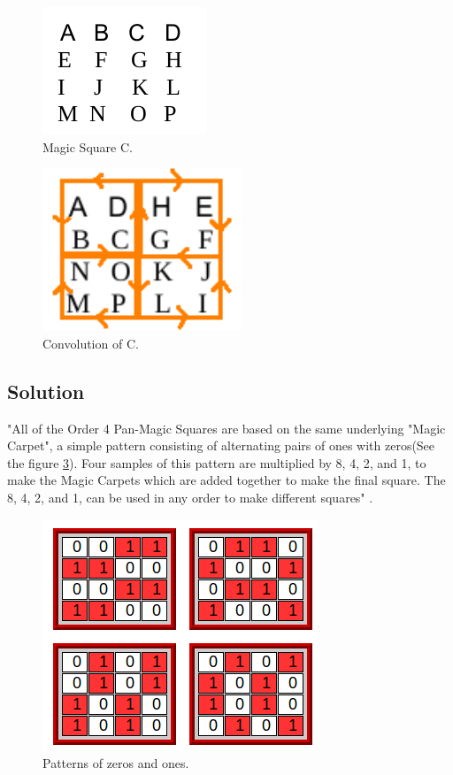 \documentclass[12pt]{article}
\begin{document}
\begin{figure}[h!]
 	\centering
  	\includegraphics[scale=0.3]
  	{Images/convolution1.png}
  	\caption{Magic Square C.}
     \label{convolution1}
\end{figure}
\begin{figure}[h!]
 	\centering
  	\includegraphics[scale=0.3]
  	{Images/convolution2.png}
  	\caption{Convolution of C.}
 \label{convolution2}
\end{figure}

\subsection{Solution}
"All of the Order 4 Pan-Magic Squares are based on the same underlying "Magic Carpet", a simple pattern consisting of alternating pairs of ones with zeros(See the figure \ref{magicarpet}). Four samples of this pattern are multiplied by 8, 4, 2, and 1, to make the Magic Carpets which are added together to make the final square. The 8, 4, 2, and 1, can be used in any order to make different squares" \cite{solution}.
\begin{figure}[h!]
 	\centering
  	\includegraphics[scale=0.4]
  	{Images/magicarpet.png}
  	\caption{Patterns of zeros and ones.}
 \label{magicarpet}
\end{figure}
\end{document}
